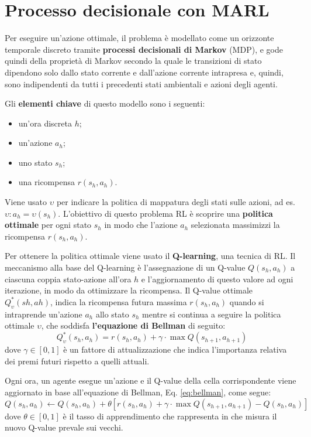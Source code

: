 \documentclass[italian, Lau, oneside]{sapthesis}
\begin{document}
\section{Processo decisionale con MARL}
Per eseguire un'azione ottimale, il problema è modellato come un orizzonte temporale discreto tramite \textbf{processi decisionali di Markov} (MDP), e gode quindi della proprietà di Markov secondo la quale le transizioni di stato dipendono solo dallo stato corrente e dall'azione corrente intrapresa e, quindi, sono indipendenti da tutti i precedenti stati ambientali e azioni degli agenti. 

Gli \textbf{elementi chiave} di questo modello sono i seguenti:
\begin{itemize}
    \item un'ora discreta $h$;
    \item un'azione $a_h$;
    \item uno stato $s_h$;
    \item una ricompensa $r(s_h, a_h)$.
\end{itemize}
Viene usato $\upsilon$ per indicare la politica di mappatura degli stati sulle azioni, ad es. $\upsilon:a_h=\upsilon(s_h)$. L'obiettivo di questo problema RL è scoprire una \textbf{politica ottimale} per ogni stato $s_h$ in modo che l'azione $a_h$ selezionata massimizzi la ricompensa $r(s_h, a_h)$.

Per ottenere la politica ottimale viene usato il \textbf{Q-learning}, una tecnica di RL. Il meccanismo alla base del Q-learning è l'assegnazione di un Q-value $Q(s_h, a_h)$ a ciascuna coppia stato-azione all'ora $h$ e l'aggiornamento di questo valore ad ogni iterazione, in modo da ottimizzare la ricompensa. Il Q-value ottimale $Q^{\ast}_\upsilon(sh, ah)$, indica la ricompensa futura massima $r(s_h, a_h)$ quando si intraprende un'azione $a_h$ allo stato $s_h$ mentre si continua a seguire la politica ottimale $\upsilon$, che soddisfa \textbf{l'equazione di Bellman} di seguito:
\begin{equation}
\label{eq:bellman}
Q^{\ast}_\upsilon(s_h, a_h)=r(s_h,a_h)+\gamma \cdot \max Q(s_{h+1}, a_{h+1})
\end{equation}
dove $\gamma \in [0,1]$  è un fattore di attualizzazione che indica l'importanza relativa dei premi futuri rispetto a quelli attuali. 

Ogni ora, un agente esegue un'azione e il Q-value della cella corrispondente viene aggiornato in base all'equazione di Bellman, Eq. \ref{eq:bellman}, come segue:
\begin{equation}
    Q(s_h, a_h) \leftarrow Q(s_h, a_h)+\theta[r(s_h, a_h)+\gamma \cdot \max Q(s_{h+1}, a_{h+1})-Q(s_h, a_h)]
\end{equation}
dove $\theta \in [0,1]$ è il tasso di apprendimento che rappresenta in che misura il nuovo Q-value prevale sui vecchi.
\end{document}
